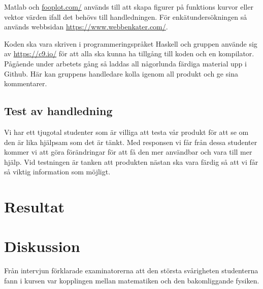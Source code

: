 \documentclass[]{article}
\begin{document}
Matlab och \url{fooplot.com/} används till att skapa figurer på funktions kurvor eller vektor 
värden ifall det behövs till handledningen. För enkätundersökningen så används webbsidan 
\url{https://www.webbenkater.com/}.

Koden ska vara skriven i programmeringspråket Haskell och gruppen använde sig av \url{https://c9.io/} 
för att alla ska kunna ha tillgång till koden och en kompilator. 
Pågående under arbetets gång så laddas all någorlunda färdiga material upp i Github. 
Här kan gruppens handledare kolla igenom all produkt och ge sina kommentarer. 


\subsection{Test av handledning}

Vi har ett tjugotal studenter som är villiga att testa vår produkt för
att se om den är lika hjälpsam som det är tänkt. Med responsen vi får
från dessa studenter kommer vi att göra förändringar för att få den mer
användbar och vara till mer hjälp. Vid testningen är tanken att
produkten nästan ska vara färdig så att vi får så viktig information som
möjligt.

\section{Resultat}


%

\section{Diskussion}




Från intervjun förklarade examinatorerna att den största svårigheten studenterna fann i kursen
var kopplingen mellan matematiken och den bakomliggande fysiken. %
\end{document}
